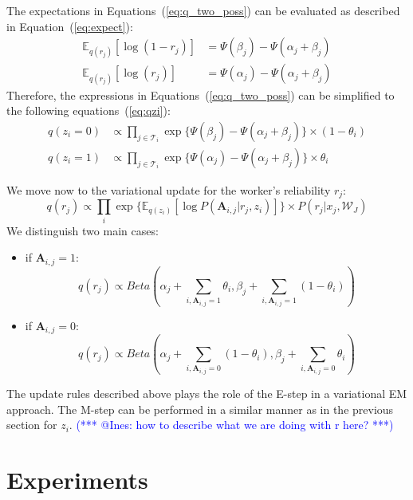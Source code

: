 \documentclass{article}
\makeatletter
\newcommand{\iar}[1]{\textcolor{blue}{(*** @Ines: #1 ***)}}
\makeatother
\begin{document}
The expectations in Equations~(\ref{eq:q_two_poss}) can be evaluated as described in Equation~(\ref{eq:expect}):
\begin{align}
    \mathbb{E}_{q(r_j)}[\log (1-r_j)]&= \Psi(\beta_j)-\Psi(\alpha_j+\beta_j) \nonumber \\
    \mathbb{E}_{q(r_j)}[\log (r_j)]&= \Psi(\alpha_j)-\Psi(\alpha_j+\beta_j)
    \label{eq:expect}
\end{align}
Therefore, the expressions in Equations~(\ref{eq:q_two_poss}) can be simplified to the following equations~(\ref{eq:qzi}):
\begin{align}
    q(z_i=0)   &\propto \prod_{j \in \mathcal{T}_{i}} \exp{\{\Psi(\beta_j)-\Psi(\alpha_j+\beta_j)\}}\times (1-\theta_i) \nonumber \\  
     q(z_i=1)    &\propto \prod_{j \in \mathcal{T}_{i}} \exp{\{ \Psi(\alpha_j)-\Psi(\alpha_j+\beta_j)\}}\times \theta_i  
     \label{eq:qzi}
\end{align}

We move now to the variational update for the worker's reliability $r_j$:
\begin{equation}
    q(r_j) \propto \prod_{i} \exp{\{\mathbb{E}_{q(z_i)}[\log{P(\mathbf{A}_{i,j}|r_j,z_i)}]\}} \times   {P(r_j|x_j,\mathcal{W}_J)}
\end{equation}
We distinguish two main cases:
\begin{itemize}
\item if $\mathbf{A}_{i,j}=1$:
\begin{equation}
  q(r_j)  \propto Beta(\alpha_j+\sum_{i,\mathbf{A}_{i,j}=1}  \theta_i,\beta_j+ \sum_{i,\mathbf{A}_{i,j}=1} (1 - \theta_i) )
  \label{eq:rj_aij_1}
\end{equation}
\item if $\mathbf{A}_{i,j}=0$:
\begin{equation}
 q(r_j)  \propto Beta(\alpha_j+\sum_{i,\mathbf{A}_{i,j}=0} (1 - \theta_i),\beta_j+ \sum_{i,\mathbf{A}_{i,j}=0} \theta_i)
   \label{eq:rj_aij_0}
\end{equation}
\end{itemize}
The update rules described above plays the role of the E-step in a variational EM approach. 
The M-step can be performed in a similar manner as in the previous section for $z_i$.
\iar{how to describe what we are doing with r here?}
\section{Experiments}
\end{document}
